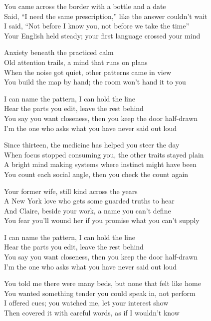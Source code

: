 \begin{lyrics}
You came across the border with a bottle and a date\\
Said, “I need the same prescription,” like the answer couldn’t wait\\
I said, “Not before I know you, not before we take the time”\\
Your English held steady; your first language crossed your mind

Anxiety beneath the practiced calm\\
Old attention trails, a mind that runs on plans\\
When the noise got quiet, other patterns came in view\\
You build the map by hand; the room won’t hand it to you

I can name the pattern, I can hold the line\\
Hear the parts you edit, leave the rest behind\\
You say you want closeness, then you keep the door half-drawn\\
I’m the one who asks what you have never said out loud

Since thirteen, the medicine has helped you steer the day\\
When focus stopped consuming you, the other traits stayed plain\\
A bright mind making systems where instinct might have been\\
You count each social angle, then you check the count again

Your former wife, still kind across the years\\
A New York love who gets some guarded truths to hear\\
And Claire, beside your work, a name you can’t define\\
You fear you’ll wound her if you promise what you can’t supply

I can name the pattern, I can hold the line\\
Hear the parts you edit, leave the rest behind\\
You say you want closeness, then you keep the door half-drawn\\
I’m the one who asks what you have never said out loud

You told me there were many beds, but none that felt like home\\
You wanted something tender you could speak in, not perform\\
I offered cues; you watched me, let your interest show\\
Then covered it with careful words, as if I wouldn’t know


\end{lyrics}
